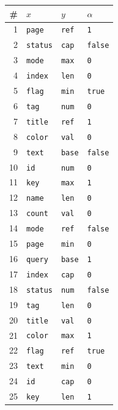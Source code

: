 \begin{table}[t]
  \centering
  \begin{tabular}{rlll}
    \toprule
    \# & $x$ & $y$ & $\alpha$ \\
    \midrule
    1 & \texttt{page} & \texttt{ref} & \texttt{1} \\
    2 & \texttt{status} & \texttt{cap} & \texttt{false} \\
    3 & \texttt{mode} & \texttt{max} & \texttt{0} \\
    4 & \texttt{index} & \texttt{len} & \texttt{0} \\
    5 & \texttt{flag} & \texttt{min} & \texttt{true} \\
    6 & \texttt{tag} & \texttt{num} & \texttt{0} \\
    7 & \texttt{title} & \texttt{ref} & \texttt{1} \\
    8 & \texttt{color} & \texttt{val} & \texttt{0} \\
    9 & \texttt{text} & \texttt{base} & \texttt{false} \\
    10 & \texttt{id} & \texttt{num} & \texttt{0} \\
    11 & \texttt{key} & \texttt{max} & \texttt{1} \\
    12 & \texttt{name} & \texttt{len} & \texttt{0} \\
    13 & \texttt{count} & \texttt{val} & \texttt{0} \\
    14 & \texttt{mode} & \texttt{ref} & \texttt{false} \\
    15 & \texttt{page} & \texttt{min} & \texttt{0} \\
    16 & \texttt{query} & \texttt{base} & \texttt{1} \\
    17 & \texttt{index} & \texttt{cap} & \texttt{0} \\
    18 & \texttt{status} & \texttt{num} & \texttt{false} \\
    19 & \texttt{tag} & \texttt{len} & \texttt{0} \\
    20 & \texttt{title} & \texttt{val} & \texttt{0} \\
    21 & \texttt{color} & \texttt{max} & \texttt{1} \\
    22 & \texttt{flag} & \texttt{ref} & \texttt{true} \\
    23 & \texttt{text} & \texttt{min} & \texttt{0} \\
    24 & \texttt{id} & \texttt{cap} & \texttt{0} \\
    25 & \texttt{key} & \texttt{len} & \texttt{1} \\

\end{tabular}
\end{table}

